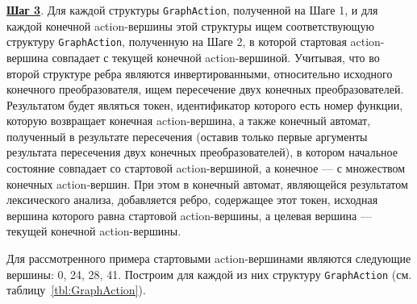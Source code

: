 \documentclass{matmex-diploma}
\begin{document}
\textbf{\underline{Шаг 3}}. Для каждой структуры \verb|GraphAction|, полученной на Шаге 1, и для каждой конечной  action-вершины этой структуры ищем соответствующую структуру \verb|GraphAction|, полученную на Шаге 2, в которой стартовая action-вершина совпадает с текущей конечной action-вершиной. Учитывая, что во второй структуре ребра являются инвертированными, относительно исходного конечного преобразователя, ищем пересечение двух конечных преобразователей. Результатом будет являться токен, идентификатор которого есть номер функции, которую возвращает конечная action-вершина, а также конечный автомат, полученный в результате пересечения (оставив только первые аргументы результата пересечения двух конечных преобразователей), в котором начальное состояние совпадает со стартовой action-вершиной, а конечное --- с множеством конечных action-вершин. При этом в конечный автомат, являющейся результатом лексического анализа, добавляется ребро, содержащее этот токен, исходная вершина которого равна стартовой action-вершины, а целевая вершина --- текущей конечной action-вершины. 

Для рассмотренного примера стартовыми action-вершинами являются следующие вершины: 0, 24, 28, 41. Построим для каждой из них структуру \verb|GraphAction| (см. таблицу~\ref{tbl:GraphAction}). 
\end{document}
